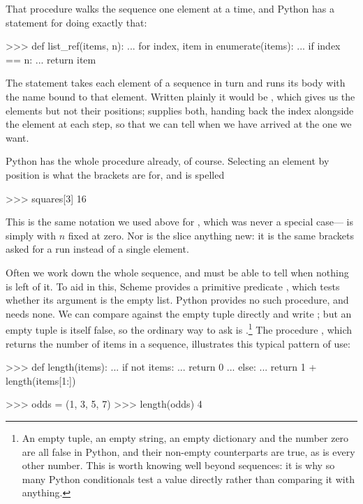 \noindent
\begin{revealTheSurface}
That procedure walks the sequence one element at a time, and Python has a
statement for doing exactly that:

\begin{codeBlock}
>>> def list_ref(items, n):
...     for index, item in enumerate(items):
...         if index == n:
...             return item
\end{codeBlock}

\noindent
The  statement takes each element of a sequence in turn and runs its
body with the name bound to that element.  Written plainly it would be
, which gives us the elements but not their positions;
 supplies both, handing back the index alongside the element at
each step, so that we can tell when we have arrived at the one we want.

Python has the whole procedure already, of course.  Selecting an element by
position is what the brackets are for, and  is spelled

\begin{codeBlock}
>>> squares[3]
16
\end{codeBlock}

\noindent
This is the same notation we used above for \code{[0]}, which was never a
special case---\code{[0]} is simply  with \( n \) fixed at
zero.  Nor is the slice \code{[1:]} anything new: it is the same brackets asked
for a run instead of a single element.
\end{revealTheSurface}

Often we work down the whole sequence, and must be able to tell when nothing is
left of it.  To aid in this, Scheme provides a primitive predicate
, which tests whether its argument is the empty list.  Python
provides no such procedure, and needs none.  We can compare against the empty
tuple directly and write ; but an empty tuple is itself
false, so the ordinary way to ask is .\footnote{An empty tuple,
an empty string, an empty dictionary and the number zero are all false in
Python, and their non-empty counterparts are true, as is every other number.
This is worth knowing well beyond sequences: it is why so many Python
conditionals test a value directly rather than comparing it with anything.} 
The procedure , which returns the number of items in a sequence,
illustrates this typical pattern of use:

\begin{codeBlock}
>>> def length(items):
...     if not items:
...         return 0
...     else:
...         return 1 + length(items[1:])

>>> odds = (1, 3, 5, 7)
>>> length(odds)
4
\end{codeBlock}

